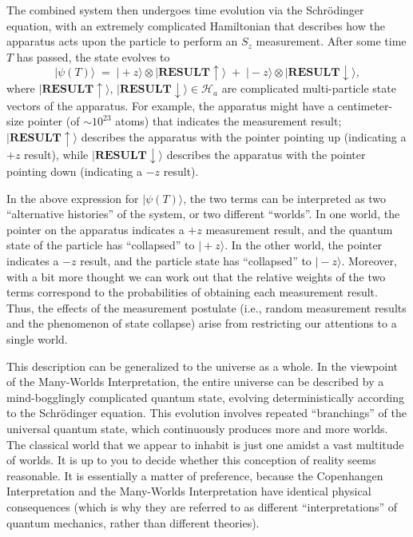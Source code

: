 \documentclass[pra,11pt]{revtex4}
\begin{document}
The combined system then undergoes time evolution via the
Schr\"odinger equation, with an extremely complicated Hamiltonian that
describes how the apparatus acts upon the particle to perform an $S_z$
measurement.  After some time $T$ has passed, the state evolves to
$$|\psi(T)\rangle \;=\; |\!+z \rangle \otimes |\textbf{RESULT}\uparrow\rangle \;+\; |\!-z\rangle\otimes |\textbf{RESULT}\downarrow\rangle, $$
where $|\textbf{RESULT}\uparrow\rangle, \,
|\textbf{RESULT}\downarrow\rangle \in \mathscr{H}_a$ are complicated
multi-particle state vectors of the apparatus.  For example, the
apparatus might have a centimeter-size pointer (of $\sim 10^{23}$
atoms) that indicates the measurement result;
$|\textbf{RESULT}\uparrow\rangle$ describes the apparatus with the
pointer pointing up (indicating a $+z$ result), while
$|\textbf{RESULT}\downarrow\rangle$ describes the apparatus with the
pointer pointing down (indicating a $-z$ result).

In the above expression for $|\psi(T)\rangle$, the two terms can be
interpreted as two ``alternative histories'' of the system, or two
different ``worlds''.  In one world, the pointer on the apparatus
indicates a $+z$ measurement result, and the quantum state of the
particle has ``collapsed'' to $|\!+z\rangle$.  In the other world, the
pointer indicates a $-z$ result, and the particle state has
``collapsed'' to $|\!-z\rangle$.  Moreover, with a bit more thought we
can work out that the relative weights of the two terms correspond to
the probabilities of obtaining each measurement result.  Thus, the
effects of the measurement postulate (i.e., random measurement results
and the phenomenon of state collapse) arise from restricting our
attentions to a single world.

This description can be generalized to the universe as a whole.  In
the viewpoint of the Many-Worlds Interpretation, the entire universe
can be described by a mind-bogglingly complicated quantum state,
evolving deterministically according to the Schr\"odinger equation.
This evolution involves repeated ``branchings'' of the universal
quantum state, which continuously produces more and more worlds.  The
classical world that we appear to inhabit is just one amidst a vast
multitude of worlds.  It is up to you to decide whether this
conception of reality seems reasonable.  It is essentially a matter of
preference, because the Copenhangen Interpretation and the Many-Worlds
Interpretation have identical physical consequences (which is why they
are referred to as different ``interpretations'' of quantum mechanics,
rather than different theories).
\end{document}

